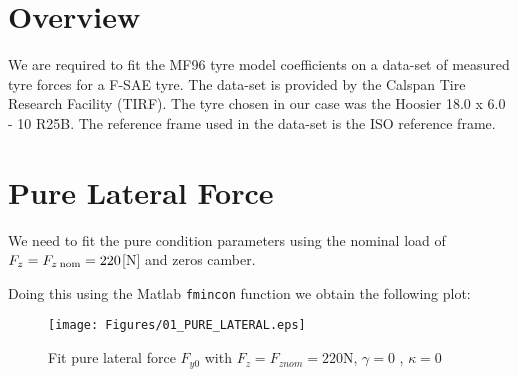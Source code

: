 \section*{Overview}

We are required to fit the MF96 tyre model coefficients on a data-set of measured tyre forces for a  F-SAE tyre.
The data-set is provided by the Calspan Tire Research Facility (TIRF). The tyre chosen in our case was the Hoosier 18.0 x 6.0 - 10 R25B.
The reference frame used in the data-set is the ISO reference frame.

\section*{Pure Lateral Force}

We need to fit the pure condition parameters using the nominal load of $F_z = F_{z\text{\:nom}} = 220$[N] and zeros camber.

Doing this using the Matlab \verb|fmincon| function we obtain the following plot:

\begin{figure}[H]
  \centering
    \texttt{[image: Figures/01\_PURE\_LATERAL.eps]}
    \caption{Fit pure lateral force $F_{y0}$ with $F_z=F_{znom}= 220$N, $\gamma=0$ , $\kappa=0$}
\end{figure}